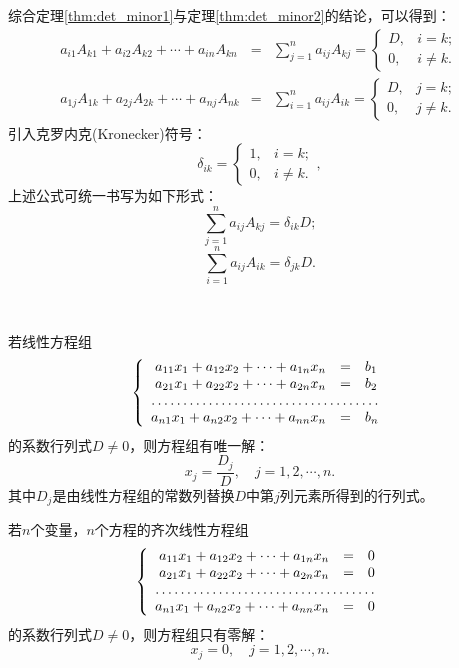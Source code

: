 \begin{rmk}
综合定理\ref{thm:det_minor1}与定理\ref{thm:det_minor2}的结论，可以得到：
\begin{eqnarray*}
a_{i1}A_{k1} + a_{i2}A_{k2} + \cdots + a_{in}A_{kn} & = & \sum\limits_{j=1}^n a_{ij}A_{kj} = \begin{cases}
D, & i = k; \\ 0, & i \neq k.
\end{cases} \\
a_{1j}A_{1k} + a_{2j}A_{2k} + \cdots + a_{nj}A_{nk} & = & \sum\limits_{i=1}^n a_{ij}A_{ik} = \begin{cases}
D, & j = k; \\ 0, & j \neq k.
\end{cases}
\end{eqnarray*}
引入克罗内克(Kronecker)符号：
$$\delta_{ik} =
\begin{cases}
1, & i = k; \\ 0, & i \neq k.
\end{cases},$$
上述公式可统一书写为如下形式：
$$\sum\limits_{j=1}^n a_{ij}A_{kj} = \delta_{ik}D;$$ $$\sum\limits_{i=1}^n a_{ij}A_{ik} = \delta_{jk}D.$$
\end{rmk}

\begin{thm}\

若线性方程组
$$\left\{ \begin{array}{rcl} a_{11}x_1 + a_{12}x_2 + \cdots + a_{1n}x_n & = & b_1 \\ a_{21}x_1 + a_{22}x_2 + \cdots + a_{2n}x_n & = & b_2 \\ \hdotsfor{3} \\ a_{n1}x_1 + a_{n2}x_2 + \cdots + a_{nn}x_n & = & b_n \end{array}\right.$$
的系数行列式$D\neq 0$，则方程组有唯一解：
$$x_j = \frac{D_j}{D}, \quad j = 1,2,\cdots,n.$$
其中$D_j$是由线性方程组的常数列替换$D$中第$j$列元素所得到的行列式。
\end{thm}

\begin{cor}
若$n$个变量，$n$个方程的齐次线性方程组
$$\left\{ \begin{array}{rcl} a_{11}x_1 + a_{12}x_2 + \cdots + a_{1n}x_n & = & 0 \\ a_{21}x_1 + a_{22}x_2 + \cdots + a_{2n}x_n & = & 0 \\ \hdotsfor{3} \\ a_{n1}x_1 + a_{n2}x_2 + \cdots + a_{nn}x_n & = & 0 \end{array}\right.$$
的系数行列式$D\neq 0$，则方程组只有零解：
$$x_j = 0, \quad j = 1,2,\cdots,n.$$
\end{cor}


